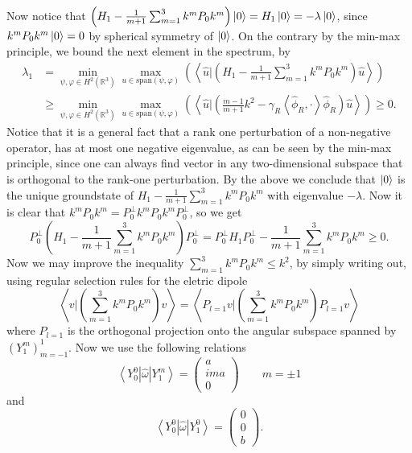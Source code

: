 \documentclass[a4paper,11pt]{article}
\newcommand{\Span}[1]{\text{span}\left(#1\right)}
\renewcommand{\braket}[1]{\left\langle#1\right\rangle}
\newcommand{\R}{\mathbb{R}}
\numberwithin{equation}{section}
\begin{document}
Now notice that $ \left(H_1-\frac{1}{m+1}\sum_{m=1}^{3}k^mP_0k^m\right)\ket{0}=H_1\ket{0}=-\lambda\ket{0} $, since $ k^mP_0k^m\ket{0}=0 $ by spherical symmetry of $ \ket{0} $. On the contrary by the min-max principle, we bound the next element in the spectrum, by \begin{equation}
\begin{aligned}
\lambda_1&=\min_{\psi,\varphi\in H^2(\R^3)}\max_{u\in\Span{\psi,\varphi}}\left(\braket{\hat{u}\Bigg|\left(H_1-\frac{1}{m+1}\sum_{m=1}^{3}k^mP_0k^m\right)\hat{u}}\right)\\
&\geq\min_{\psi,\varphi\in H^2(\R^3)}\max_{u\in\Span{\psi,\varphi}}\left(\braket{\hat{u}\Bigg|\left(\frac{m-1}{m+1}k^2-\gamma_R\braket{\hat{\phi}_R,\cdot}\hat{\phi}_R\right)\hat{u}}\right)\geq0.
\end{aligned}
\end{equation}
Notice that it is a general fact that a rank one perturbation of a non-negative operator, has at most one negative eigenvalue, as can be seen by the min-max principle, since one can always find vector in any two-dimensional subspace that is orthogonal to the rank-one perturbation.
By the above we conclude that $ \ket{0} $ is the unique groundstate of $ H_1-\frac{1}{m+1}\sum_{m=1}^{3}k^mP_0k^m $ with eigenvalue $ -\lambda $. Now it is clear that $ k^mP_0k^m=P_0^\perp k^mP_0k^mP_0^\perp $, so we get\begin{equation}
P_0^\perp \left(H_1-\frac{1}{m+1}\sum_{m=1}^{3}k^mP_0k^m\right)P_0^\perp=P_0^\perp H_1P_0^\perp-\frac{1}{m+1}\sum_{m=1}^{3}k^mP_0k^m\geq 0.
\end{equation}
Now we may improve the inequality $  \sum_{m=1}^{3}k^mP_0k^m\leq k^2 $, by simply writing out, using regular selection rules for the eletric dipole \begin{equation}
\braket{v\Bigg|\left(\sum_{m=1}^{3}k^mP_0k^m\right)v}=\braket{P_{l=1}v\Bigg|\left(\sum_{m=1}^{3}k^mP_0k^m\right)P_{l=1}v}
\end{equation}
where $ P_{l=1} $ is the orthogonal projection onto the angular subspace spanned by $ (Y_1^m)_{m=-1} ^{1}$. Now we use the following relations \begin{equation}
\braket{Y_0^0|\hat{\omega}|Y_1^m}=\begin{pmatrix}
a\\
ima\\
0
\end{pmatrix} \qquad m=\pm 1
\end{equation}
and \begin{equation}
\braket{Y_0^0|\hat{\omega}|Y_1^0}=\begin{pmatrix}
0\\
0\\
b
\end{pmatrix}.
\end{equation}
\end{document}
